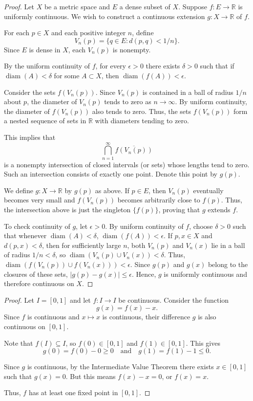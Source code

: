 \documentclass[11pt]{article}
\DeclareMathOperator{\diam}{diam}
\begin{document}
\begin{exercise}{13}
    \begin{proof}
        Let $X$ be a metric space and $E$ a dense subset of $X$. Suppose $f: E \to \mathbb{R}$ is uniformly continuous. We wish to construct a continuous extension $g: X \to \mathbb{R}$ of $f$.

For each $p \in X$ and each positive integer $n$, define
\[
V_n(p) = \{ q \in E : d(p,q) < 1/n \}.
\]
Since $E$ is dense in $X$, each $V_n(p)$ is nonempty.

By the uniform continuity of $f$, for every $\epsilon > 0$ there exists $\delta > 0$ such that if $\diam(A) < \delta$ for some $A \subset X$, then $\diam(f(A)) < \epsilon$.

Consider the sets $f(V_n(p))$. Since $V_n(p)$ is contained in a ball of radius $1/n$ about $p$, the diameter of $V_n(p)$ tends to zero as $n \to \infty$. By uniform continuity, the diameter of $f(V_n(p))$ also tends to zero. Thus, the sets $f(V_n(p))$ form a nested sequence of sets in $\mathbb{R}$ with diameters tending to zero.

This implies that
\[
\bigcap_{n=1}^{\infty} \overline{f(V_n(p))}
\]
is a nonempty intersection of closed intervals (or sets) whose lengths tend to zero. Such an intersection consists of exactly one point. Denote this point by $g(p)$.

We define $g: X \to \mathbb{R}$ by $g(p)$ as above. If $p \in E$, then $V_n(p)$ eventually becomes very small and $f(V_n(p))$ becomes arbitrarily close to $f(p)$. Thus, the intersection above is just the singleton $\{ f(p) \}$, proving that $g$ extends $f$.

To check continuity of $g$, let $\epsilon > 0$. By uniform continuity of $f$, choose $\delta > 0$ such that whenever $\diam(A) < \delta$, $\diam(f(A)) < \epsilon$. If $p, x \in X$ and $d(p,x) < \delta$, then for sufficiently large $n$, both $V_n(p)$ and $V_n(x)$ lie in a ball of radius $1/n < \delta$, so $\diam(V_n(p) \cup V_n(x)) < \delta$. Thus, $\diam(f(V_n(p)) \cup f(V_n(x))) < \epsilon$. Since $g(p)$ and $g(x)$ belong to the closures of these sets, $|g(p)-g(x)| \leq \epsilon$. Hence, $g$ is uniformly continuous and therefore continuous on $X$.
    \end{proof}
\end{exercise}

\begin{exercise}{14}
    \begin{proof}
        Let $I = [0,1]$ and let $f: I \to I$ be continuous. Consider the function
\[
g(x) = f(x) - x.
\]
Since $f$ is continuous and $x \mapsto x$ is continuous, their difference $g$ is also continuous on $[0,1]$.

Note that $f(I) \subseteq I$, so $f(0) \in [0,1]$ and $f(1) \in [0,1]$. This gives
\[
g(0) = f(0) - 0 \geq 0 \quad \text{and} \quad g(1) = f(1) - 1 \leq 0.
\]

Since $g$ is continuous, by the Intermediate Value Theorem there exists $x \in [0,1]$ such that $g(x) = 0$. But this means $f(x) - x = 0$, or $f(x) = x$.

Thus, $f$ has at least one fixed point in $[0,1]$.
    \end{proof}
\end{exercise}
\end{document}

